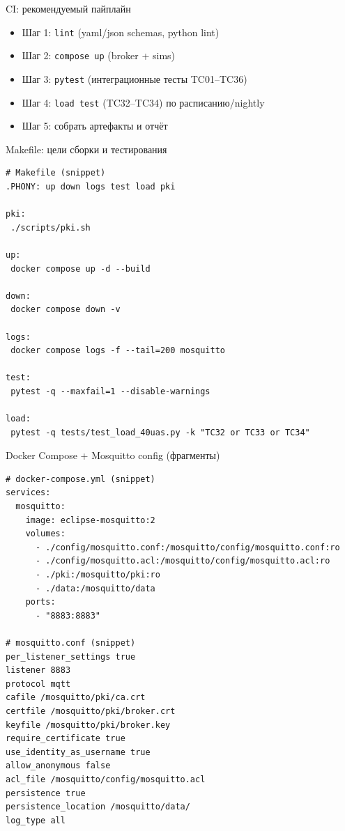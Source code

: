 \documentclass[aspectratio=169]{beamer}
\begin{document}
\begin{frame}[fragile]{CI: рекомендуемый пайплайн}
\begin{itemize}
  \item Шаг 1: \texttt{lint} (yaml/json schemas, python lint)
  \item Шаг 2: \texttt{compose up} (broker + sims)
  \item Шаг 3: \texttt{pytest} (интеграционные тесты TC01--TC36)
  \item Шаг 4: \texttt{load test} (TC32--TC34) по расписанию/nightly
  \item Шаг 5: собрать артефакты и отчёт
\end{itemize}
\end{frame}

\begin{frame}[fragile]{Makefile: цели сборки и тестирования}
\small
\begin{verbatim}
# Makefile (snippet)
.PHONY: up down logs test load pki

pki:
 ./scripts/pki.sh

up:
 docker compose up -d --build

down:
 docker compose down -v

logs:
 docker compose logs -f --tail=200 mosquitto

test:
 pytest -q --maxfail=1 --disable-warnings

load:
 pytest -q tests/test_load_40uas.py -k "TC32 or TC33 or TC34"
\end{verbatim}
\end{frame}
\begin{frame}[fragile]{Docker Compose + Mosquitto config (фрагменты)}
\small
\begin{verbatim}
# docker-compose.yml (snippet)
services:
  mosquitto:
    image: eclipse-mosquitto:2
    volumes:
      - ./config/mosquitto.conf:/mosquitto/config/mosquitto.conf:ro
      - ./config/mosquitto.acl:/mosquitto/config/mosquitto.acl:ro
      - ./pki:/mosquitto/pki:ro
      - ./data:/mosquitto/data
    ports:
      - "8883:8883"

# mosquitto.conf (snippet)
per_listener_settings true
listener 8883
protocol mqtt
cafile /mosquitto/pki/ca.crt
certfile /mosquitto/pki/broker.crt
keyfile /mosquitto/pki/broker.key
require_certificate true
use_identity_as_username true
allow_anonymous false
acl_file /mosquitto/config/mosquitto.acl
persistence true
persistence_location /mosquitto/data/
log_type all
\end{verbatim}
\end{frame}
\end{document}
